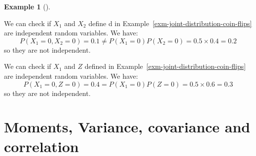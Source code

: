\documentclass[
  letterpaper,
  DIV=11,
  numbers=noendperiod]{scrreport}
\theoremstyle{definition}
\newtheorem{example}{Example}[chapter]
\theoremstyle{plain}
\theoremstyle{definition}
\theoremstyle{plain}
\theoremstyle{remark}
\begin{document}
\begin{tcolorbox}[enhanced jigsaw, breakable, opacityback=0, leftrule=.75mm, colback=white, bottomtitle=1mm, coltitle=black, toptitle=1mm, titlerule=0mm, bottomrule=.15mm, colframe=quarto-callout-note-color-frame, title={Example of Independent Random Variables}, opacitybacktitle=0.6, colbacktitle=quarto-callout-note-color!10!white, rightrule=.15mm, arc=.35mm, toprule=.15mm, left=2mm]

\begin{example}[]\protect\hypertarget{exm-independent-random-variables}{}\label{exm-independent-random-variables}

We can check if \(X_1\) and \(X_2\) define d in
Example~\ref{exm-joint-distribution-coin-flips} are independent random
variables. We have: \[
P(X_1=0, X_2=0) = 0.1 \neq P(X_1=0)P(X_2=0) = 0.5\times 0.4 = 0.2
\] so they are not independent.

We can check if \(X_1\) and \(Z\) defined in
Example~\ref{exm-joint-distribution-coin-flips} are independent random
variables. We have: \[
P(X_1=0, Z=0) = 0.4 = P(X_1=0)P(Z=0) = 0.5\times 0.6 = 0.3
\] so they are not independent.

\end{example}

\end{tcolorbox}

\section{Moments, Variance, covariance and
correlation}\label{moments-variance-covariance-and-correlation}
\end{document}
